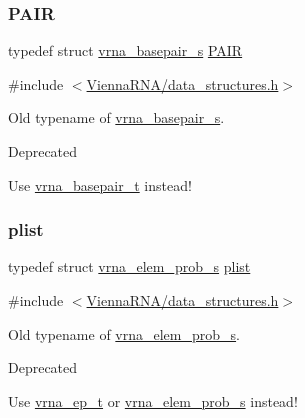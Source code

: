\subsubsection{\texorpdfstring{P\+A\+IR}{PAIR}}
{\footnotesize\ttfamily typedef struct \mbox{\hyperlink{group__data__structures_structvrna__basepair__s}{vrna\+\_\+basepair\+\_\+s}} \mbox{\hyperlink{group__data__structures_ga4381025ffbd692e54189b2c679c79c99}{P\+A\+IR}}}



{\ttfamily \#include $<$\mbox{\hyperlink{data__structures_8h}{Vienna\+R\+N\+A/data\+\_\+structures.\+h}}$>$}



Old typename of \mbox{\hyperlink{group__data__structures_structvrna__basepair__s}{vrna\+\_\+basepair\+\_\+s}}. 

\begin{DoxyRefDesc}{Deprecated}
\item[\mbox{\hyperlink{deprecated__deprecated000047}{Deprecated}}]Use \mbox{\hyperlink{group__data__structures_gac8c5669d3fb813cacf506489689305ce}{vrna\+\_\+basepair\+\_\+t}} instead! \end{DoxyRefDesc}
\mbox{\label{group__data__structures_ga9608eed021ebfbdd7a901cfdc446c8e9}} 
\subsubsection{\texorpdfstring{plist}{plist}}
{\footnotesize\ttfamily typedef struct \mbox{\hyperlink{group__struct__utils_structvrna__elem__prob__s}{vrna\+\_\+elem\+\_\+prob\+\_\+s}} \mbox{\hyperlink{group__data__structures_ga9608eed021ebfbdd7a901cfdc446c8e9}{plist}}}



{\ttfamily \#include $<$\mbox{\hyperlink{data__structures_8h}{Vienna\+R\+N\+A/data\+\_\+structures.\+h}}$>$}



Old typename of \mbox{\hyperlink{group__struct__utils_structvrna__elem__prob__s}{vrna\+\_\+elem\+\_\+prob\+\_\+s}}. 

\begin{DoxyRefDesc}{Deprecated}
\item[\mbox{\hyperlink{deprecated__deprecated000048}{Deprecated}}]Use \mbox{\hyperlink{group__struct__utils_gab9ac98ab55ded9fb90043b024b915aca}{vrna\+\_\+ep\+\_\+t}} or \mbox{\hyperlink{group__struct__utils_structvrna__elem__prob__s}{vrna\+\_\+elem\+\_\+prob\+\_\+s}} instead! \end{DoxyRefDesc}
\mbox{\label{group__data__structures_ga8412f116a2eb07b59ade9e14ca7c5ef1}} 
